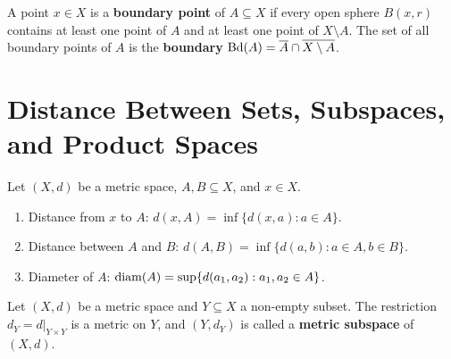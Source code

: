\begin{definition}
A point $x \in X$ is a \textbf{boundary point} of $A \subseteq X$ if every open sphere $B(x,r)$ contains at least one point of $A$ and at least one point of $X \setminus A$. The set of all boundary points of $A$ is the \textbf{boundary} $\operatorname{Bd}(A) = \overline{A} \cap \overline{X \setminus A}$.
\end{definition}


\section{Distance Between Sets, Subspaces, and Product Spaces}
\label{sec:subspace_product}

\begin{definition}
Let $(X,d)$ be a metric space, $A, B \subseteq X$, and $x \in X$.
\begin{enumerate}[label=\rm{(\roman*)}]
    \item Distance from $x$ to $A$: $d(x,A) = \inf \{d(x,a) : a \in A\}$.
    \item Distance between $A$ and $B$: $d(A,B) = \inf \{d(a,b) : a \in A, b \in B\}$.
    \item Diameter of $A$: $\operatorname{diam}(A) = \sup \{d(a_1, a_2) : a_1, a_2 \in A\}$.
\end{enumerate}
\end{definition}

\begin{definition}
Let $(X,d)$ be a metric space and $Y \subseteq X$ a non-empty subset. The restriction $d_Y = d|_{Y \times Y}$ is a metric on $Y$, and $(Y, d_Y)$ is called a \textbf{metric subspace} of $(X,d)$.
\end{definition}
